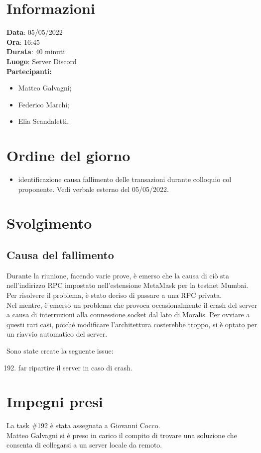\documentclass[a4paper, 12pt]{article}
\begin{document}
\makefrontpage

\section{Informazioni}
\textbf{Data}: 05/05/2022\\
\textbf{Ora}: 16:45\\
\textbf{Durata}: 40 minuti\\
\textbf{Luogo}: Server Discord\\

\textbf{Partecipanti:}
\begin{itemize}
	\item Matteo Galvagni;
	\item Federico Marchi;
	\item Elia Scandaletti.
\end{itemize}


\section{Ordine del giorno}
\begin{itemize}
	\item identificazione causa fallimento delle transazioni durante colloquio col proponente. Vedi verbale esterno del 05/05/2022.
\end{itemize}

\section{Svolgimento}

\subsection{Causa del fallimento}
Durante la riunione, facendo varie prove, è emerso che la causa di ciò sta nell'indirizzo RPC impostato nell'estensione MetaMask per la testnet Mumbai. Per risolvere il problema, è stato deciso di passare a una RPC privata. \\
Nel mentre, è emerso un problema che provoca occasionalmente il crash del server a causa di interruzioni alla connessione socket dal lato di Moralis. Per ovviare a questi rari casi, poiché modificare l'architettura costerebbe troppo, si è optato per un riavvio automatico del server.

Sono state create la seguente issue:
\begin{enumerate}[label=\textbf{\#\theenumi}]
  \setcounter{enumi}{191}
	\item far ripartire il server in caso di crash.
\end{enumerate}

\section{Impegni presi}
La task \#192 è stata assegnata a Giovanni Cocco. \\
Matteo Galvagni si è preso in carico il compito di trovare una soluzione che consenta di collegarsi a un server locale da remoto.
\end{document}

